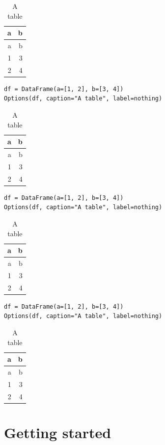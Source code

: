 \documentclass[
  14pt
  american,
  paper=a4,
  ,captions=tableheading
]{scrreprt}
\begin{document}
\begin{longtable}[]{@{}rr@{}}
\caption{A table}\tabularnewline
\toprule
a & b \\
\midrule
\endfirsthead
\toprule
a & b \\
\midrule
\endhead
1 & 3 \\
2 & 4 \\
\bottomrule
\end{longtable}

\begin{lstlisting}
df = DataFrame(a=[1, 2], b=[3, 4])
Options(df, caption="A table", label=nothing)
\end{lstlisting}

\begin{longtable}[]{@{}rr@{}}
\caption{A table}\tabularnewline
\toprule
a & b \\
\midrule
\endfirsthead
\toprule
a & b \\
\midrule
\endhead
1 & 3 \\
2 & 4 \\
\bottomrule
\end{longtable}

\begin{lstlisting}
df = DataFrame(a=[1, 2], b=[3, 4])
Options(df, caption="A table", label=nothing)
\end{lstlisting}

\begin{longtable}[]{@{}rr@{}}
\caption{A table}\tabularnewline
\toprule
a & b \\
\midrule
\endfirsthead
\toprule
a & b \\
\midrule
\endhead
1 & 3 \\
2 & 4 \\
\bottomrule
\end{longtable}

\begin{lstlisting}
df = DataFrame(a=[1, 2], b=[3, 4])
Options(df, caption="A table", label=nothing)
\end{lstlisting}

\begin{longtable}[]{@{}rr@{}}
\caption{A table}\tabularnewline
\toprule
a & b \\
\midrule
\endfirsthead
\toprule
a & b \\
\midrule
\endhead
1 & 3 \\
2 & 4 \\
\bottomrule
\end{longtable}

\hypertarget{sec:getting-started}{%
\chapter{Getting started}\label{sec:getting-started}}
\end{document}
